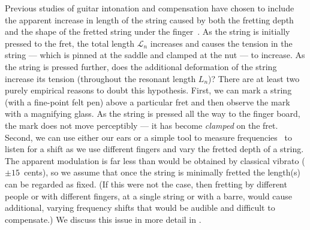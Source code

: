 Previous studies of guitar intonation and compensation have chosen to include the apparent increase in length of the string caused by both the fretting depth and the shape of the fretted string under the finger~\cite{ref:byers1996cgi,ref:varieschi2010icf}. As the string is initially pressed to the fret, the total length $\mathcal{L}_n$ increases and causes the tension in the string --- which is pinned at the saddle and clamped at the nut --- to increase. As the string is pressed further, does the additional deformation of the string increase its tension (throughout the resonant length $L_n$)? There are at least two purely empirical reasons to doubt this hypothesis. First, we can mark a string (with a fine-point felt pen) above a particular fret and then observe the mark with a magnifying glass. As the string is pressed all the way to the finger board, the mark does not move perceptibly --- it has become \emph{clamped} on the fret. Second, we can use either our ears or a simple tool to measure frequencies~\cite{ref:pgtweb} to listen for a shift as we use different fingers and vary the fretted depth of a string. The apparent modulation is far less than would be obtained by classical vibrato ($\pm15$~cents), so we assume that once the string is minimally fretted the length(s) can be regarded as fixed. (If this were not the case, then fretting by different people or with different fingers, at a single string or with a barre, would cause additional, varying frequency shifts that would be audible and difficult to compensate.) We discuss this issue in more detail in .

